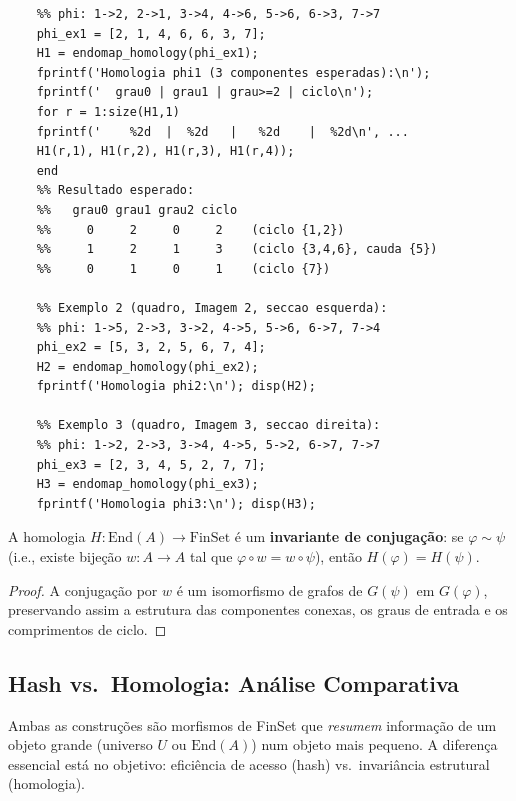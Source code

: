 \begin{lstlisting}[style=matlab, caption={Exemplos de homologia do quadro da aula}]
	%% Exemplo 1 (quadro, Imagem 4):
	%% phi: 1->2, 2->1, 3->4, 4->6, 5->6, 6->3, 7->7
	phi_ex1 = [2, 1, 4, 6, 6, 3, 7];
	H1 = endomap_homology(phi_ex1);
	fprintf('Homologia phi1 (3 componentes esperadas):\n');
	fprintf('  grau0 | grau1 | grau>=2 | ciclo\n');
	for r = 1:size(H1,1)
	fprintf('    %2d  |  %2d   |   %2d    |  %2d\n', ...
	H1(r,1), H1(r,2), H1(r,3), H1(r,4));
	end
	%% Resultado esperado:
	%%   grau0 grau1 grau2 ciclo
	%%     0     2     0     2    (ciclo {1,2})
	%%     1     2     1     3    (ciclo {3,4,6}, cauda {5})
	%%     0     1     0     1    (ciclo {7})
	
	%% Exemplo 2 (quadro, Imagem 2, seccao esquerda):
	%% phi: 1->5, 2->3, 3->2, 4->5, 5->6, 6->7, 7->4
	phi_ex2 = [5, 3, 2, 5, 6, 7, 4];
	H2 = endomap_homology(phi_ex2);
	fprintf('Homologia phi2:\n'); disp(H2);
	
	%% Exemplo 3 (quadro, Imagem 3, seccao direita):
	%% phi: 1->2, 2->3, 3->4, 4->5, 5->2, 6->7, 7->7
	phi_ex3 = [2, 3, 4, 5, 2, 7, 7];
	H3 = endomap_homology(phi_ex3);
	fprintf('Homologia phi3:\n'); disp(H3);
\end{lstlisting}

\begin{proposition}
	A homologia $H: \mathrm{End}(A) \to \mathrm{FinSet}$ é um
	\textbf{invariante de conjugação}: se $\varphi \sim \psi$
	(i.e., existe bijeção $w : A \to A$ tal que
	$\varphi \circ w = w \circ \psi$), então
	$H(\varphi) = H(\psi)$.
\end{proposition}
\begin{proof}
	A conjugação por $w$ é um isomorfismo de grafos de $G(\psi)$
	em $G(\varphi)$, preservando assim a estrutura das componentes
	conexas, os graus de entrada e os comprimentos de ciclo.
\end{proof}

\subsection{Hash vs.\ Homologia: Análise Comparativa}

Ambas as construções são morfismos de FinSet que \emph{resumem}
informação de um objeto grande (universo $U$ ou $\mathrm{End}(A)$)
num objeto mais pequeno. A diferença essencial está no objetivo:
eficiência de acesso (hash) vs.\ invariância estrutural
(homologia).

